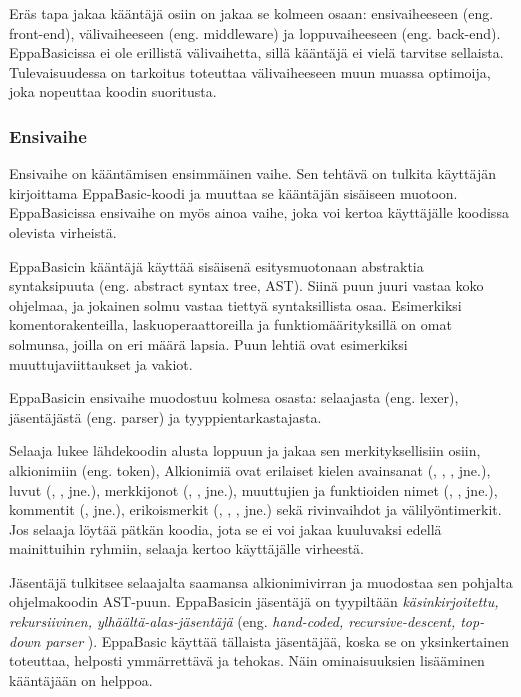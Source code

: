 Eräs tapa jakaa kääntäjä osiin on jakaa
se kolmeen osaan:
ensivaiheeseen (eng. front-end),
välivaiheeseen (eng. middleware) ja
loppuvaiheeseen (eng. back-end).
EppaBasicissa ei ole erillistä välivaihetta,
sillä kääntäjä ei vielä tarvitse sellaista.
Tulevaisuudessa on tarkoitus toteuttaa
välivaiheeseen muun muassa optimoija,
joka nopeuttaa koodin suoritusta.

\subsubsection{Ensivaihe}
Ensivaihe on kääntämisen ensimmäinen vaihe.
Sen tehtävä on tulkita käyttäjän kirjoittama
EppaBasic-koodi ja muuttaa se kääntäjän
sisäiseen muotoon.
EppaBasicissa ensivaihe on myös ainoa
vaihe, joka voi kertoa käyttäjälle
koodissa olevista virheistä.

EppaBasicin kääntäjä käyttää sisäisenä
esitysmuotonaan abstraktia syntaksipuuta
(eng. abstract syntax tree, AST).
Siinä puun juuri vastaa koko ohjelmaa,
ja jokainen solmu vastaa tiettyä
syntaksillista osaa.
Esimerkiksi komentorakenteilla,
laskuoperaattoreilla ja
funktiomäärityksillä
on omat solmunsa, joilla on eri määrä lapsia.
Puun lehtiä ovat esimerkiksi
muuttujaviittaukset ja vakiot.

EppaBasicin ensivaihe muodostuu
kolmesa osasta:
selaajasta (eng. lexer),
jäsentäjästä (eng. parser) ja
tyyppientarkastajasta.

Selaaja lukee lähdekoodin alusta loppuun
ja jakaa sen merkityksellisiin osiin,
alkionimiin (eng. token),
Alkionimiä ovat erilaiset kielen
avainsanat (, , , jne.),
luvut (, , jne.),
merkkijonot (, , jne.),
muuttujien ja funktioiden nimet (, , jne.),
kommentit (, jne.),
erikoismerkit (\eb{+}, \eb{-}, \eb{^}, jne.) sekä
rivinvaihdot ja välilyöntimerkit.
Jos selaaja löytää pätkän koodia,
jota se ei voi jakaa kuuluvaksi
edellä mainittuihin ryhmiin,
selaaja kertoo käyttäjälle virheestä.

Jäsentäjä tulkitsee selaajalta saamansa
alkionimivirran ja muodostaa sen pohjalta
ohjelmakoodin AST-puun.
EppaBasicin jäsentäjä on tyypiltään
\emph{käsinkirjoitettu, rekursiivinen,
ylhäältä-alas-jäsentäjä}
(eng. \emph{hand-coded, recursive-descent,
top-down parser} \cite[luku 3.3.2]{eac2e}).
EppaBasic käyttää tällaista jäsentäjää,
koska se on yksinkertainen toteuttaa,
helposti ymmärrettävä ja tehokas.
Näin ominaisuuksien lisääminen
kääntäjään on helppoa.

